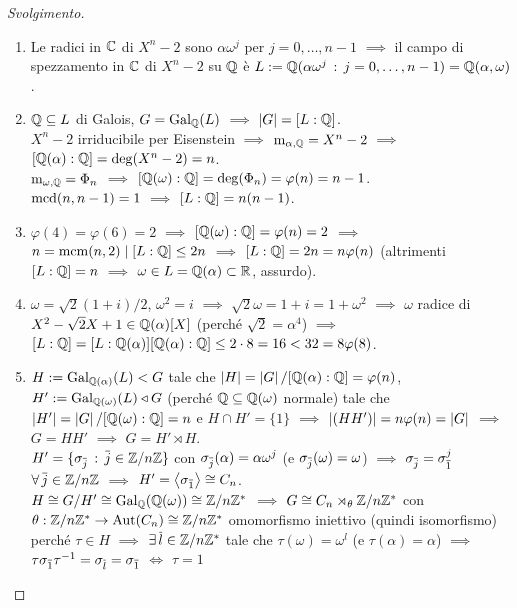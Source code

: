 \begin{proof}[Svolgimento]
\begin{enumerate}
\item Le radici in $\C$ di $X^n-2$ sono $\alpha\omega^j$ per $j=0,\dots,n-1$ $\implies$ il campo di spezzamento in $\C$ di $X^n-2$ su $\Q$ è $L:=\Q(\alpha\omega^j\st j=0,\dots,n-1)=\Q(\alpha,\omega)$.
\item $\Q\subseteq L$ di Galois, $G=\Gal[\Q]{L}$ $\implies$ $\card{G}=[L:\Q]$. \\
$X^n-2$ irriducibile per Eisenstein $\implies$ $\polmin_{\alpha,\Q}=X^n-2$ $\implies$ $[\Q(\alpha):\Q]=\deg(X^n-2)=n$. \\
$\polmin_{\omega,\Q}=\Phi_n$ $\implies$ $[\Q(\omega):\Q]=\deg(\Phi_n)=\varphi(n)=n-1$. \\
$\mcd(n,n-1)=1$ $\implies$ $[L:\Q]=n(n-1)$.
\item $\varphi(4)=\varphi(6)=2$ $\implies$ $[\Q(\omega):\Q]=\varphi(n)=2$ $\implies$ $n=\mcm(n,2)\dvd[L:\Q]\le2n$ $\implies$ $[L:\Q]=2n=n\varphi(n)$ (altrimenti $[L:\Q]=n$ $\implies$ $\omega\in L=\Q(\alpha)\subset\R$, assurdo).
\item $\omega=\sqrt{2}(1+i)/2$, $\omega^2=i$ $\implies$ $\sqrt{2}\omega=1+i=1+\omega^2$ $\implies$ $\omega$ radice di $X^2-\sqrt{2}X+1\in\Q(\alpha)[X]$ (perché $\sqrt{2}=\alpha^4$) $\implies$ $[L:\Q]=[L:\Q(\alpha)][\Q(\alpha):\Q]\le2\cdot8=16<32=8\varphi(8)$.
\item $H:=\Gal[\Q(\alpha)]{L}<G$ tale che $\card{H}=\card{G}/[\Q(\alpha):\Q]=\varphi(n)$, $H':=\Gal[\Q(\omega)]{L}\normal G$ (perché $\Q\subseteq\Q(\omega)$ normale) tale che $\card{H'}=\card{G}/[\Q(\omega):\Q]=n$ e $H\cap H'=\{1\}$ $\implies$ $\card{(HH')}=n\varphi(n)=\card{G}$ $\implies$ $G=HH'$ $\implies$ $G=H'\rtimes H$. \\
$H'=\{\sigma_{\cl{j}}\st\cl{j}\in\Z/n\Z\}$ con $\sigma_{\cl{j}}(\alpha)=\alpha\omega^j$ (e $\sigma_{\cl{j}}(\omega)=\omega$) $\implies$ $\sigma_{\cl{j}}=\sigma_{\cl{1}}^j$ $\all \cl{j}\in\Z/n\Z$ $\implies$ $H'=\gen{\sigma_{\cl{1}}}\iso C_n$. \\
$H\iso G/H'\iso\Gal[\Q]{\Q(\omega)}\iso\Z/n\Z^*$ $\implies$ $G\iso C_n\rtimes_{\theta}\Z/n\Z^*$ con $\theta : \Z/n\Z^*\to\Aut(C_n)\iso\Z/n\Z^*$ omomorfismo iniettivo (quindi isomorfismo) perché $\tau\in H$ $\implies$ $\exi\cl{l}\in\Z/n\Z^*$ tale che $\tau(\omega)=\omega^l$ (e $\tau(\alpha)=\alpha$) $\implies$ $\tau\sigma_{\cl{1}}\tau^{-1}=\sigma_{\cl{l}}=\sigma_{\cl{1}}$ $\iff$ $\tau=1$ \qedhere
\end{enumerate}
\end{proof}


